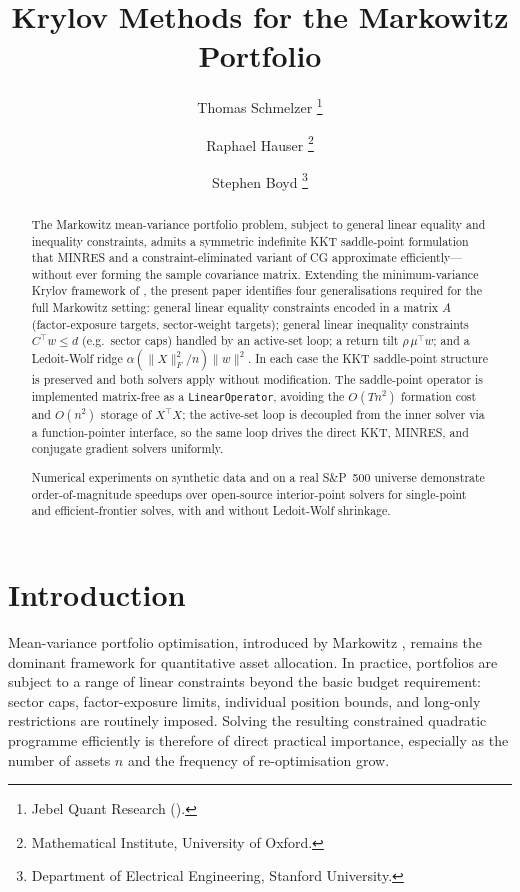 \documentclass{siam/siamart}
\title{Krylov Methods for the Markowitz Portfolio}
\author{Thomas Schmelzer%
  \thanks{Jebel Quant Research (\email{thomas@jqr.ae}).}
  \and
  Raphael Hauser%
  \thanks{Mathematical Institute, University of Oxford.}
  \and
  Stephen Boyd%
  \thanks{Department of Electrical Engineering, Stanford University.}
}
\begin{document}
\maketitle

\begin{abstract}
The Markowitz mean-variance portfolio problem, subject to general linear equality and
inequality constraints, admits a symmetric indefinite KKT saddle-point formulation that
MINRES \cite{paige1975} and a constraint-eliminated variant of CG \cite{hestenes1952}
approximate efficiently---without ever forming the sample covariance matrix.
Extending the minimum-variance Krylov framework of \cite{minvar_paper}, the
present paper identifies four generalisations required for the full Markowitz setting:
general linear equality constraints encoded in a matrix $A$ (factor-exposure targets,
sector-weight targets); general linear inequality constraints $C^\top w \leq d$ (e.g.\ sector caps)
handled by an active-set loop; a return tilt $\rho\,\mu^\top w$; and a Ledoit-Wolf
ridge $\alpha(\|X\|_F^2/n)\|w\|^2$.  In each case the KKT saddle-point structure is preserved and
both solvers apply without modification.  The saddle-point operator is implemented
matrix-free as a \texttt{LinearOperator}, avoiding the $O(Tn^2)$ formation cost and
$O(n^2)$ storage of $X^\top X$; the active-set loop is decoupled from the inner solver
via a function-pointer interface, so the same loop drives the direct KKT, MINRES, and
conjugate gradient \cite{hestenes1952} solvers uniformly.

Numerical experiments on synthetic data and on a real S\&P~500 universe demonstrate
order-of-magnitude speedups over open-source interior-point solvers for single-point
and efficient-frontier solves, with and without Ledoit-Wolf shrinkage.
\end{abstract}

\section{Introduction}

Mean-variance portfolio optimisation, introduced by Markowitz \cite{markowitz1952}, remains the
dominant framework for quantitative asset allocation.  In practice, portfolios are subject to a
range of linear constraints beyond the basic budget requirement: sector caps, factor-exposure
limits, individual position bounds, and long-only restrictions are routinely imposed.  Solving the resulting
constrained quadratic programme efficiently is therefore of direct practical importance, especially
as the number of assets $n$ and the frequency of re-optimisation grow.
\end{document}
